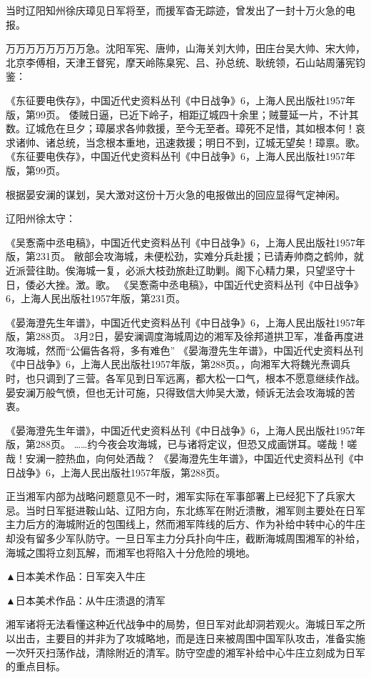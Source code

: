 \documentclass[12pt,UTF8]{ctexbook}
\begin{document}
当时辽阳知州徐庆璋见日军将至，而援军杳无踪迹，曾发出了一封十万火急的电报。

万万万万万万万万急。沈阳军宪、唐帅，山海关刘大帅，田庄台吴大帅、宋大帅，北京李傅相，天津王督宪，摩天岭陈臬宪、吕、孙总统、耿统领，石山站周藩宪钧鉴：

《东征要电佚存》，中国近代史资料丛刊《中日战争》6，上海人民出版社1957年版，第99页。
倭贼日逼，已近下岭子，相距辽城四十余里；贼蔓延一片，不计其数。辽城危在旦夕；璋屡求各帅救援，至今无至者。璋死不足惜，其如根本何！哀求诸帅、诸总统，当念根本重地，迅速救援；明日不到，辽城无望矣！璋禀。歌。 《东征要电佚存》，中国近代史资料丛刊《中日战争》6，上海人民出版社1957年版，第99页。

根据晏安澜的谋划，吴大澂对这份十万火急的电报做出的回应显得气定神闲。

辽阳州徐太守：

《吴愙斋中丞电稿》，中国近代史资料丛刊《中日战争》6，上海人民出版社1957年版，第231页。
敝部会攻海城，未便松劲，实难分兵赴援；已请寿帅商之鹤帅，就近派营往助。俟海城一复，必派大枝劲旅赴辽助剿。阁下心精力果，只望坚守十日，倭必大挫。澂。歌。 《吴愙斋中丞电稿》，中国近代史资料丛刊《中日战争》6，上海人民出版社1957年版，第231页。

《晏海澄先生年谱》，中国近代史资料丛刊《中日战争》6，上海人民出版社1957年版，第288页。
3月2日，晏安澜调度海城周边的湘军及徐邦道拱卫军，准备再度进攻海城，然而“公偏告各将，多有难色” 《晏海澄先生年谱》，中国近代史资料丛刊《中日战争》6，上海人民出版社1957年版，第288页。，向湘军大将魏光焘调兵时，也只调到了三营。各军见到日军远离，都大松一口气，根本不愿意继续作战。晏安澜万般气愤，但也无计可施，只得致信大帅吴大澂，倾诉无法会攻海城的苦衷。

《晏海澄先生年谱》，中国近代史资料丛刊《中日战争》6，上海人民出版社1957年版，第288页。
……约今夜会攻海城，已与诸将定议，但恐又成画饼耳。嗟哉！嗟哉！安澜一腔热血，向何处洒哉？ 《晏海澄先生年谱》，中国近代史资料丛刊《中日战争》6，上海人民出版社1957年版，第288页。

正当湘军内部为战略问题意见不一时，湘军实际在军事部署上已经犯下了兵家大忌。当时日军挺进鞍山站、辽阳方向，东北练军在附近溃散，湘军则主要处在日军主力后方的海城附近的包围线上，然而湘军阵线的后方、作为补给中转中心的牛庄却没有留多少军队防守。一旦日军主力分兵扑向牛庄，截断海城周围湘军的补给，海城之围将立刻瓦解，而湘军也将陷入十分危险的境地。


▲日本美术作品：日军突入牛庄


▲日本美术作品：从牛庄溃退的清军

湘军诸将无法看懂这种近代战争中的局势，但日军对此却洞若观火。海城日军之所以出击，主要目的并非为了攻城略地，而是连日来被周围中国军队攻击，准备实施一次歼灭扫荡作战，清除附近的清军。防守空虚的湘军补给中心牛庄立刻成为日军的重点目标。
\end{document}
